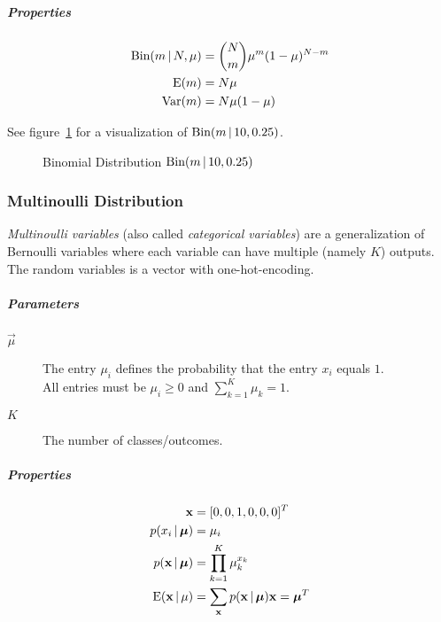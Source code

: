 				\subparagraph{Properties}
				\begin{align}
					\textrm{Bin}(m \,\vert\, N, \mu) & = { N \choose m } \mu^m (1 - \mu)^{N - m} \\
					\operatorname{E}(m)                         & = N\mu                                \\
					\operatorname{Var}(m)                       & = N \mu (1 - \mu)
				\end{align}

				See figure~\ref{fig:binomialDistribution} for a visualization of \( \textrm{Bin}(m \,\vert\, 10, 0.25) \).

				\begin{figure}
					\centering
					\caption{Binomial Distribution \( \textrm{Bin}(m \,\vert\, 10, 0.25) \)}
					\label{fig:binomialDistribution}
				\end{figure}

			\subsubsection{Multinoulli Distribution}
				\emph{Multinoulli variables} (also called \emph{categorical variables}) are a generalization of Bernoulli variables where each variable can have multiple (namely \(K\)) outputs. The random variables is a vector with one-hot-encoding.

				\subparagraph{Parameters}
				\begin{description}
					\item[\(\vec{\mu}\)] The entry \(\mu_i\) defines the probability that the entry \(x_i\) equals \(1\). \\ All entries must be \( \mu_i \geq 0 \) and \( \sum_{k = 1}^{K} \mu_k = 1 \).
					\item [\(K\)] The number of classes/outcomes.
				\end{description}

				\subparagraph{Properties}
				\begin{align}
					\boldsymbol{\mathrm{x}}                     & = [ 0, 0, 1, 0, 0, 0 ]^T                                           \\
					p(x_i \,\vert\, \boldsymbol{\mathrm{\mu}})     & = \mu_i                                                            \\
					p(\boldsymbol{\mathrm{x}} \,\vert\, \boldsymbol{\mathrm{\mu}}) & = \prod_{k = 1}^{K} \mu_k^{x_k}                                    \\
					\operatorname{E}(\boldsymbol{\mathrm{x}} \,\vert\, \mu)      & = \sum_{\boldsymbol{\mathrm{x}}} p(\boldsymbol{\mathrm{x}} \,\vert\, \boldsymbol{\mathrm{\mu}}) \boldsymbol{\mathrm{x}} = \boldsymbol{\mathrm{\mu}}^T
				\end{align}

